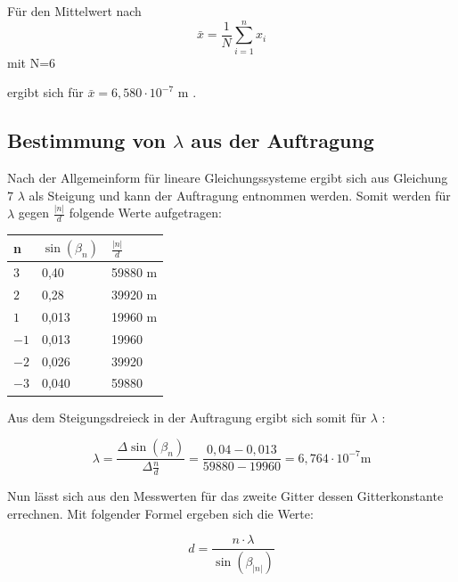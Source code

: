 \documentclass[12pt,a4paper,titlepage,headinclude,bibtotoc]{scrartcl}
\begin{document}
Für den Mittelwert nach
\[\bar{x} =\frac{1}{N}\sum_{i=1}^n x_i\] mit N=6

ergibt sich für $\bar{x} = 6,580\cdot10^{-7}$ m .


\subsection{Bestimmung von $\lambda$ aus der Auftragung}

Nach der Allgemeinform für lineare Gleichungssysteme ergibt sich aus Gleichung 7 $\lambda$ als Steigung und kann der Auftragung entnommen werden. Somit werden für ${\lambda}$ gegen $\frac{|n|}{d}$ folgende Werte aufgetragen:\\

\begin{table} [h]
\centering
\begin{tabular}{|p{4 cm}||p{4 cm}|p{4 cm}|}
        \hline
		n & $\sin(\beta_n)$ & $\frac{|n|}{d}$\\
         \hline 
         $3$ & 0,40 & 59880 m  \\
         \hline
         $2$ & 0,28 & 39920 m \\
         \hline
         $1$ & 0,013 & 19960 m\\
         \hline
         $-1$ & 0,013 &  19960  \\
         \hline
         $-2$ & 0,026 & 39920   \\
         \hline             
         $-3$ & 0,040 & 59880   \\
         \hline
\end{tabular}
\end{table}

Aus dem Steigungsdreieck in der Auftragung ergibt sich somit für $\lambda$ :

\begin{equation}
\lambda =  \frac{\Delta \sin(\beta_n)}{\Delta\frac{n}{d}} = \frac{0,04 - 0,013}{59880 - 19960} = 6,764 \cdot 10^{-7} \mathrm{m}
\end{equation}

Nun lässt sich aus den Messwerten für das zweite Gitter dessen Gitterkonstante errechnen. Mit folgender Formel ergeben sich die Werte:

\begin{equation}
d = \dfrac{n\cdot \lambda}{\sin(\beta_{|n|})} 
\end{equation}
\end{document}
